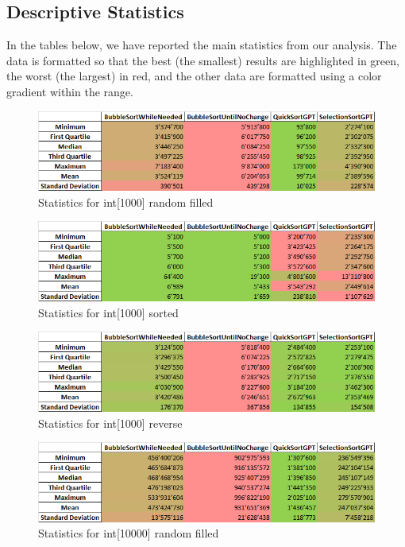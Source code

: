 \documentclass{article}
\begin{document}
    \FloatBarrier

    \subsection{Descriptive Statistics}
    In the tables below, we have reported the main statistics from our analysis. The data is formatted so that the best (the smallest) results are highlighted in green, the worst (the largest) in red, and the other data are formatted using a color gradient within the range.
    \begin{figure}[!h]
        \centering
        \includegraphics[width=0.75\linewidth]{int1000rand-stat.png}
        \caption{Statistics for int[1000] random filled}
        \label{fig:int1000rand-stat}
    \end{figure}
    \begin{figure}[!h]
        \centering
        \includegraphics[width=0.75\linewidth]{int1000sort-stat.png}
        \caption{Statistics for int[1000] sorted}
        \label{fig:int1000sort-stat}
    \end{figure}
    \begin{figure}[!h]
        \centering
        \includegraphics[width=0.75\linewidth]{int1000rev-stat.png}
        \caption{Statistics for int[1000] reverse}
        \label{fig:int1000rev-stat}
    \end{figure}
    \begin{figure}[!h]
        \centering
        \includegraphics[width=0.75\linewidth]{int10000rand-stat.png}
        \caption{Statistics for int[10000] random filled}
        \label{fig:int10000rand-stat}
    \end{figure}
\end{document}
